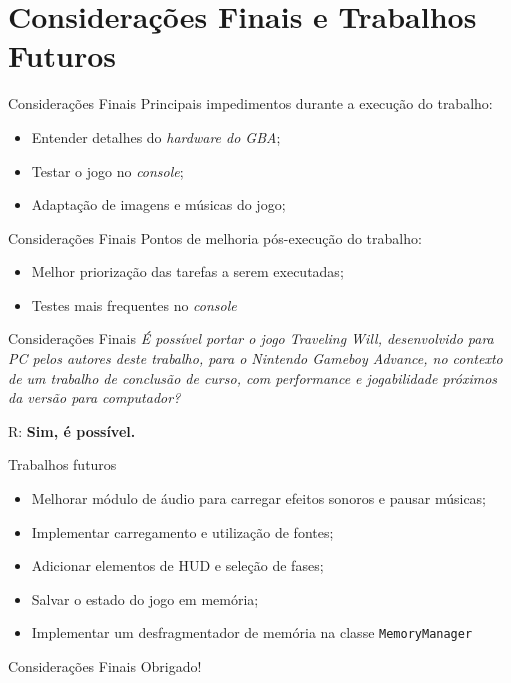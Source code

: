 \documentclass[notes, mathserif]{beamer}
\begin{document}
\section{Considera\c c\~oes Finais e Trabalhos Futuros}

\begin{frame}{Considera\c c\~oes Finais}
	Principais impedimentos durante a execu\c c\~ao do trabalho:
	\begin{itemize}[<+->]
		\item Entender detalhes do \textit{hardware do GBA};
		\item Testar o jogo no \textit{console};
		\item Adapta\c c\~ao de imagens e m\'usicas do jogo;
	\end{itemize}
\end{frame}

\begin{frame}{Considera\c c\~oes Finais}
	Pontos de melhoria p\'os-execu\c c\~ao do trabalho:
	\begin{itemize}[<+->]
		\item Melhor prioriza\c c\~ao das tarefas a serem executadas;
		\item Testes mais frequentes no \textit{console}
	\end{itemize}
\end{frame}

\begin{frame}{Considera\c c\~oes Finais}
	\textit{\'E poss\'ivel portar o jogo Traveling Will,
desenvolvido para PC pelos autores deste trabalho, para o Nintendo Gameboy Advance, no
contexto de um trabalho de conclus\~ao de curso, com performance e jogabilidade pr\'oximos
da vers\~ao para computador?}
\par
R: \textbf{Sim, \'e poss\'ivel.}
\end{frame}

\begin{frame}{Trabalhos futuros}
	\begin{itemize}[<+->]
		\item Melhorar m\'odulo de \'audio para carregar efeitos sonoros e pausar m\'usicas;
		\item Implementar carregamento e utiliza\c c\~ao de fontes;
		\item Adicionar elementos de HUD e sele\c c\~ao de fases;
		\item Salvar o estado do jogo em mem\'oria;
		\item Implementar um desfragmentador de mem\'oria na classe \texttt{MemoryManager}
	\end{itemize}
\end{frame}

\begin{frame}{Considera\c c\~oes Finais}
	Obrigado!
\end{frame}
\end{document}
